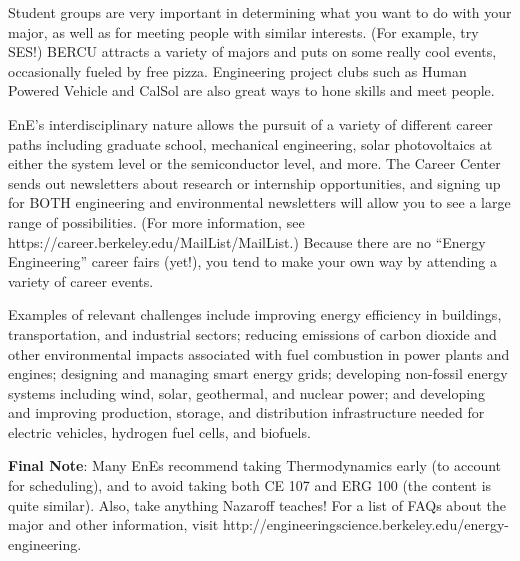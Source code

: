 Student groups are very important in determining what you want to do with your major, as well as for meeting people with similar interests. (For example, try SES!) BERCU attracts a variety of majors and puts on some really cool events, occasionally fueled by free pizza. Engineering project clubs such as Human Powered Vehicle and CalSol are also great ways to hone skills and meet people.
 
EnE’s interdisciplinary nature allows the pursuit of a variety of different career paths including graduate school, mechanical engineering, solar photovoltaics at either the system level or the semiconductor level, and more. The Career Center sends out newsletters about research or internship opportunities, and signing up for BOTH engineering and environmental newsletters will allow you to see a large range of possibilities. (For more information, see https://career.berkeley.edu/MailList/MailList.) Because there are no “Energy Engineering” career fairs (yet!), you tend to make your own way by attending a variety of career events.
 
Examples of relevant challenges include improving energy efficiency in buildings, transportation, and industrial sectors; reducing emissions of carbon dioxide and other environmental impacts associated with fuel combustion in power plants and engines; designing and managing smart energy grids; developing non-fossil energy systems including wind, solar, geothermal, and nuclear power; and developing and improving production, storage, and distribution infrastructure needed for electric vehicles, hydrogen fuel cells, and biofuels.

\textbf{Final Note}: Many EnEs recommend taking Thermodynamics early (to account for scheduling), and to avoid taking both CE 107 and ERG 100 (the content is quite similar). Also, take anything Nazaroff teaches! For a list of FAQs about the major and other information, visit http://engineeringscience.berkeley.edu/energy-engineering.

